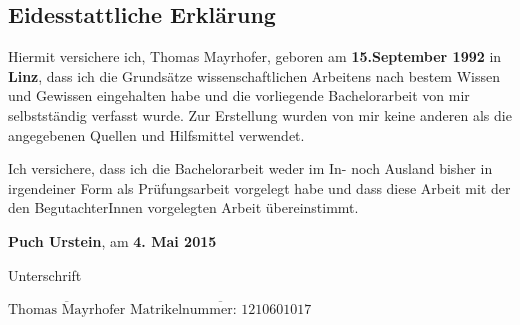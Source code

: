 \subsection*{Eidesstattliche Erklärung}

Hiermit versichere ich, Thomas Mayrhofer, geboren am {\bf 15.September 1992} in {\bf Linz}, dass ich die Grundsätze wissenschaftlichen Arbeitens nach bestem Wissen und Gewissen eingehalten habe und die vorliegende Bachelorarbeit von mir selbstständig verfasst wurde. Zur Erstellung wurden von mir keine anderen als die angegebenen Quellen und Hilfsmittel verwendet. 

Ich versichere, dass ich die Bachelorarbeit weder im In- noch Ausland bisher in irgendeiner Form als Prüfungsarbeit vorgelegt habe und dass diese Arbeit mit der den \mbox{BegutachterInnen} vorgelegten Arbeit übereinstimmt.


\vspace*{3cm}

{\bf Puch Urstein}, am {\bf 4. Mai 2015}


\hfill


Unterschrift

\vspace*{1cm}

$\overline{\text{Thomas Mayrhofer}}$ \hfill	$\overline{\text{Matrikelnummer: 1210601017}}$